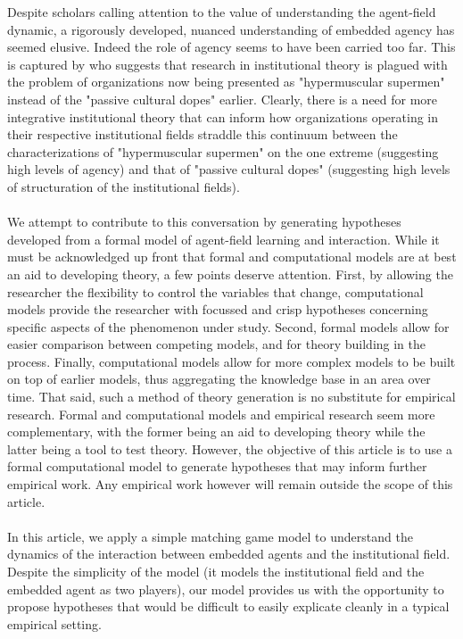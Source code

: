 \documentclass[12pt,letterpaper]{article}
\begin{document}
\noindent Despite scholars calling attention to the value of understanding the agent-field dynamic, a rigorously developed, nuanced understanding of embedded agency has seemed elusive. Indeed the role of agency seems to have been carried too far. This is captured by \cite{Suddaby2010} who suggests that research in institutional theory is plagued with the problem of organizations now being presented as "hypermuscular supermen" instead of the "passive cultural dopes" earlier. Clearly, there is a need for more integrative institutional theory that can inform how organizations operating in their respective institutional fields straddle this continuum between the characterizations of "hypermuscular supermen" on the one extreme (suggesting high levels of agency) and that of "passive cultural dopes" (suggesting high levels of structuration of the institutional fields).\\\\

\noindent We attempt to contribute to this conversation by generating hypotheses developed from a formal model of agent-field learning and interaction. While it must be acknowledged up front that formal and computational models are at best an aid to developing theory, a few points deserve attention. First, by allowing the researcher the flexibility to control the variables that change, computational models provide the researcher with focussed and crisp hypotheses concerning specific aspects of the phenomenon under study. Second, formal models allow for easier comparison between competing models, and for theory building in the process. Finally, computational models allow for more complex models to be built on top of earlier models, thus aggregating the knowledge base in an area over time. That said, such a method of theory generation is no substitute for empirical research. Formal and computational models and empirical research seem more complementary, with the former being an aid to developing theory while the latter being a tool to test theory. However, the objective of this article is to use a formal computational model to generate hypotheses that may inform further empirical work. Any empirical work however will remain outside the scope of this article.\\\\

\noindent In this article, we apply a simple matching game model to  understand the dynamics of the interaction between embedded agents and the institutional field. Despite the simplicity of the model (it models the institutional field and the embedded agent as two players), our model provides us with the opportunity to propose hypotheses that would be difficult to easily explicate cleanly in a typical empirical setting.\\\\
\end{document}
